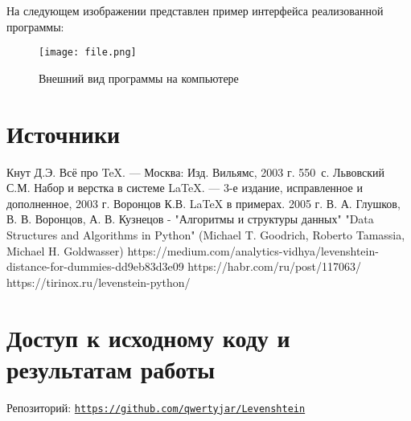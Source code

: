 \documentclass[12pt,a4paper]{scrartcl}
\begin{document}
На следующем изображении представлен пример интерфейса реализованной программы:

\begin{figure}[H]
    \centering
    \texttt{[image: file.png]}
    \caption{Внешний вид программы на компьютере}
    \label{fig:desktop-view}
\end{figure}

\section{Источники}

\begin{thebibliography}{9}
Кнут Д.Э. Всё про \TeX. \newblock --- Москва: Изд. Вильямс, 2003 г. 550~с.
Львовский С.М. Набор и верстка в системе \LaTeX{}. \newblock --- 3-е издание, исправленное и дополненное, 2003 г.
Воронцов К.В. \LaTeX{} в примерах. 2005 г.
В. А. Глушков, В. В. Воронцов, А. В. Кузнецов - "Алгоритмы и структуры данных" 
"Data Structures and Algorithms in Python" (Michael T. Goodrich, Roberto Tamassia, Michael H. Goldwasser)
 https://medium.com/analytics-vidhya/levenshtein-distance-for-dummies-dd9eb83d3e09
 https://habr.com/ru/post/117063/
 https://tirinox.ru/levenstein-python/
\end{thebibliography}

\section{Доступ к исходному коду и результатам работы}
\item Репозиторий: \texttt{\url{https://github.com/qwertyjar/Levenshtein}}
\end{document}
